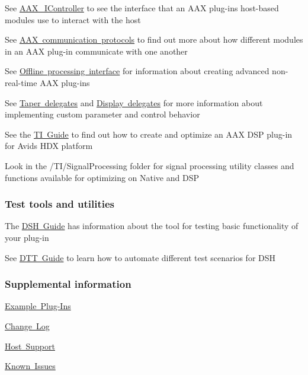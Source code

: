 \begin{DoxyItemize}
\item See \mbox{\hyperlink{a01789}{A\+A\+X\+\_\+\+I\+Controller}} to see the interface that an A\+AX plug-\/in\textquotesingle{}s host-\/based modules use to interact with the host \item See \mbox{\hyperlink{a00800}{A\+AX communication protocols}} to find out more about how different modules in an A\+AX plug-\/in communicate with one another \item See \mbox{\hyperlink{a00804}{Offline processing interface}} for information about creating advanced non-\/real-\/time A\+AX plug-\/ins \item See \mbox{\hyperlink{a00815}{Taper delegates}} and \mbox{\hyperlink{a00816}{Display delegates}} for more information about implementing custom parameter and control behavior \item See the \mbox{\hyperlink{a00832}{TI Guide}} to find out how to create and optimize an A\+AX D\+SP plug-\/in for Avid\textquotesingle{}s H\+DX platform \item Look in the /\+T\+I/\+Signal\+Processing folder for signal processing utility classes and functions available for optimizing on Native and D\+SP\end{DoxyItemize}
\hypertarget{a00793_welcome_testtools}{}\subsubsection{Test tools and utilities}\label{a00793_welcome_testtools}
\begin{DoxyItemize}
\item The \mbox{\hyperlink{a00835}{D\+SH Guide}} has information about the tool for testing basic functionality of your plug-\/in \item See \mbox{\hyperlink{a00836}{D\+TT Guide}} to learn how to automate different test scenarios for D\+SH\end{DoxyItemize}
\hypertarget{a00793_welcome_supplemental}{}\subsubsection{Supplemental information}\label{a00793_welcome_supplemental}
\begin{DoxyItemize}
\item \mbox{\hyperlink{a00848}{Example Plug-\/\+Ins}} \item \mbox{\hyperlink{a00847}{Change Log}} \item \mbox{\hyperlink{a00845}{Host Support}} \item \mbox{\hyperlink{a00846}{Known Issues}}\end{DoxyItemize}

